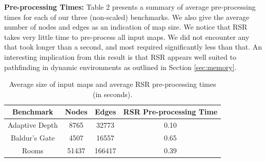 \textbf{Pre-processing Times: } 
Table 2 presents a summary of average pre-processing times for
each of our three (non-scaled) benchmarks. We also give the average number of
nodes and edges as an indication of map size.
We notice that RSR takes very little time to pre-process all input maps. 
We did not encounter any that took longer than a second, and most required 
significantly less than that. 
An interesting implication from this result is that RSR appears well suited to
pathfinding in dynamic environments as outlined in Section \ref{sec:memory}.


\begin{table}
\label{table:preproc}
\begin{center}
\begin{tabular}{|c|c|c|c|}
\hline
\textbf{Benchmark} & \textbf{Nodes} & \textbf{Edges} & \textbf{RSR Pre-processing Time} \\ \hline
Adaptive Depth & 8765 &  32773 & 0.10 \\ \hline
Baldur's Gate & 4507 & 16557 & 0.65 \\ \hline
Rooms & 51437 & 166417 & 0.39 \\ \hline
\end{tabular}
\end{center}
\caption{Average size of input maps and average RSR pre-processing times (in
seconds). }
\end{table}

